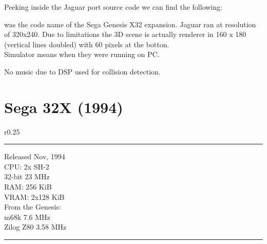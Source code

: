 \par
Peeking inside the Jaguar port source code we can find the following:\\
\par
{}
\par
{} was the code name of the Sega Genesis X32 expansion. Jaguar ran at resolution of 320x240. Due to limitations the 3D scene is actually renderer in 160 x 180 (vertical lines doubled) with 60 pixels at the botton.\\
Simulator means when they were running on PC.
\par
No music due to DSP used for collision detection.\\





\section{Sega 32X (1994)}

\begin{wrapfigure}[15]{r}{0.25\textwidth}{\centering {}}
\hrule 
\bigskip
   Released Nov, 1994\\
   CPU: 2x SH-2 \\
   32-bit 23 MHz\\
   RAM: 256 KiB\\
   VRAM: 2x128 KiB\\

   From the Genesis:\\
   m68k 7.6 MHz\\
   Zilog Z80 3.58 MHz\\
\hrule 
\end{wrapfigure}


